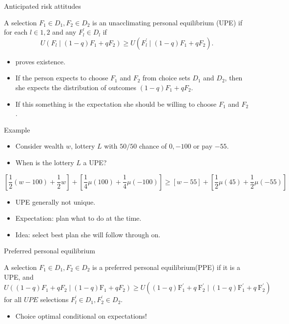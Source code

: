 \begin{frame}{Anticipated risk attitudes}
     \begin{definition}[UPE]
        A selection $F_1 \in D_1, F_2 \in D_2$ is an unacclimating personal equilibrium (UPE) if for each $l \in 1,2$
        and any $F_l^{\prime} \in D_l$ if
        \[U\left(F_l \mid(1-q) F_1+q F_2\right) \geq U\left(F_l^{\prime} \mid(1-q) F_1+ q F_2\right).\]
    \end{definition}

    \begin{itemize}
    \item  \citet{Koszegi2010}  proves existence.\medskip
        \item  If the person expects to choose $F_1$ and $F_2$ from choice sets $D_1$ and $D_2$, then she expects the distribution of outcomes $(1-q) F_1+q F_2$.\medskip
        \item If this something is the expectation she should be willing to choose  $F_1$ and $F_2$.\medskip
    \end{itemize}
\end{frame}


\begin{frame}{Example}
\begin{itemize}
\item Consider wealth $w$, lottery $L$ with $50/50$ chance of $0,-100$ or pay $-55$.\medskip
\item When is the lottery $L$ a UPE?\medskip
\end{itemize}
\[
\left[\frac{1}{2}(w -100)+\frac{1}{2} w\right]
 +\left[\frac{1}{4} \mu(100)+\frac{1}{4} \mu(-100)\right]
\geq  {[w-55] } + \left[\frac{1}{2} \mu(45)+\frac{1}{2} \mu(-55)\right]
\]
    \begin{itemize}
        \item UPE generally not unique.\medskip
        \item Expectation: plan what to do at the time.\medskip
        \item Idea: select best plan she will follow through on.\medskip
    \end{itemize}
\end{frame}

\begin{frame}{Preferred personal equilibrium }
    \begin{definition}[PPE]
        A selection $F_1 \in D_1, F_2 \in D_2$ is a preferred personal equilibrium(PPE) if it is a UPE,
        and \[U\left((1-q) F_1+q F_2 \mid(1-q) \mathrm{F}_1+qF_2\right) \geq U\left((1-q) \mathrm{F}_1^{\prime}+q \mathrm{~F}_2^{\prime} \mid(1-q) \mathrm{F}_1^{\prime}+q \mathrm{~F}_2^{\prime}\right)\]
        for all $U P E$ selections $F_l^{\prime} \in D_1, F_2^{\prime} \in D_2$.\\
    \end{definition}
\begin{itemize}
\item Choice optimal \alert{conditional on} expectations!
\end{itemize}
\end{frame}

